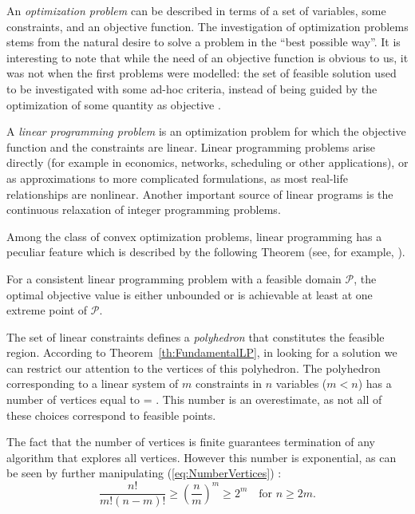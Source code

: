 An {\em optimization problem} can be described in terms of a set of variables, 
some constraints, and an objective function. 
The investigation of optimization problems stems from the natural
desire to solve a problem in the ``best possible way''.
It is interesting to note that while the need of an objective function 
is obvious to us, it was not when the first problems were modelled: the 
set of feasible solution used to be investigated with some ad-hoc criteria, 
instead of being guided by the optimization of some quantity as 
objective \cite{Dantzig02}.

A {\em linear programming problem} is an optimization problem for which
the objective function and the constraints are linear. 
Linear programming problems arise directly (for example in economics,
networks, scheduling or other applications), or as approximations to
more complicated formulations, as most real-life relationships are
nonlinear. Another important source of linear programs is the 
continuous relaxation of integer programming problems.

Among the class of convex optimization problems, linear programming
has a peculiar feature which is described by the following Theorem
(see, for example, \cite{FangPuthenpura93}).

\begin{theorem}
\label{th:FundamentalLP}
For a consistent linear programming problem with a
feasible domain $\mathcal{P}$, the optimal objective value is either
unbounded or is achievable at least at one extreme point of $\mathcal{P}$.
\end{theorem}

The set of linear constraints defines a {\em polyhedron} that constitutes
the feasible region.
According to Theorem~\ref{th:FundamentalLP}, in looking for a solution 
we can restrict our attention to the vertices of this polyhedron.
The polyhedron corresponding to a linear system of $m$ constraints 
in $n$ variables ($m < n$) has a number of vertices equal to
\be \label{eq:NumberVertices}
 = .
\ee
This number is an overestimate, as not all of these choices correspond
to feasible points.

The fact that the number of vertices is finite guarantees termination 
of any algorithm that explores all vertices.
However this number is exponential, as can be seen by further
manipulating (\ref{eq:NumberVertices}) \cite[ch.~5.2]{FangPuthenpura93}:
\[
\frac{n!}{m!(n-m)!} \ge \left( \frac{n}{m} \right)^m \ge 2^m 
\quad \mbox{for } n \ge 2m.
\]

